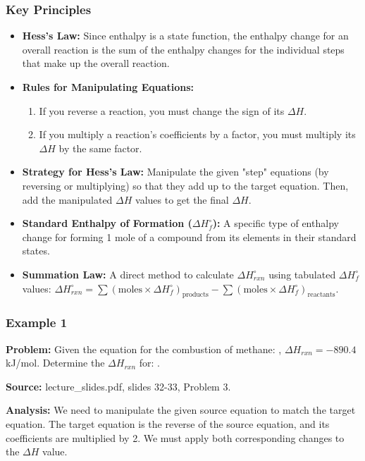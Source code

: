 \documentclass{article}
\begin{document}
\subsubsection{Key Principles}
\begin{itemize}
    \item \textbf{Hess's Law:} Since enthalpy is a state function, the enthalpy change for an overall reaction is the sum of the enthalpy changes for the individual steps that make up the overall reaction.
    \item \textbf{Rules for Manipulating Equations:}
        \begin{enumerate}
            \item If you reverse a reaction, you must change the sign of its $\Delta H$.
            \item If you multiply a reaction's coefficients by a factor, you must multiply its $\Delta H$ by the same factor.
        \end{enumerate}
    \item \textbf{Strategy for Hess's Law:} Manipulate the given "step" equations (by reversing or multiplying) so that they add up to the target equation. Then, add the manipulated $\Delta H$ values to get the final $\Delta H$.
    \item \textbf{Standard Enthalpy of Formation ($\Delta H_f^\circ$):} A specific type of enthalpy change for forming 1 mole of a compound from its elements in their standard states.
    \item \textbf{Summation Law:} A direct method to calculate $\Delta H_{rxn}^\circ$ using tabulated $\Delta H_f^\circ$ values: $\Delta H_{rxn}^\circ = \sum (\text{moles} \times \Delta H_f^\circ)_{\text{products}} - \sum (\text{moles} \times \Delta H_f^\circ)_{\text{reactants}}$.
\end{itemize}

\subsubsection{Example 1}
\textbf{Problem:} Given the equation for the combustion of methane: , $\Delta H_{rxn} = -890.4$ kJ/mol. Determine the $\Delta H_{rxn}$ for: .

\textbf{Source:} lecture\_slides.pdf, slides 32-33, Problem 3.

\textbf{Analysis:} We need to manipulate the given source equation to match the target equation. The target equation is the reverse of the source equation, and its coefficients are multiplied by 2. We must apply both corresponding changes to the $\Delta H$ value.
\end{document}

